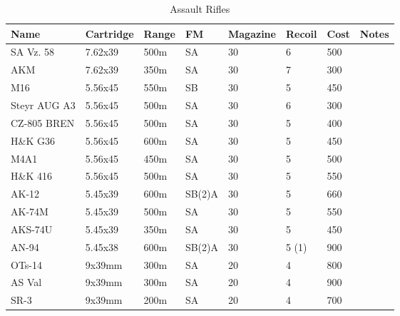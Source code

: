 \begin{table}
  \caption{Assault Rifles}
  \begin{center}
    \begin{tabular}{| l | l | l | l | l | l | l | l |}
      \hline
      \textbf{Name} & \textbf{Cartridge} & \textbf{Range} &
      \textbf{FM} & \textbf{Magazine} & \textbf{Recoil} &
      \textbf{Cost} & \textbf{Notes} \\ \hline

      SA Vz. 58    & 7.62x39 & 500m & SA  & 30 & 6 & 500 & \\ \hline
      AKM          & 7.62x39 & 350m & SA  & 30 & 7 & 300 & \\ \hline

      M16          & 5.56x45 & 550m & SB  & 30 & 5 & 450 & \\ \hline
      Steyr AUG A3 & 5.56x45 & 500m & SA  & 30 & 6 & 300 & \\ \hline
      CZ-805 BREN  & 5.56x45 & 500m & SA  & 30 & 5 & 400 & \\ \hline
      H\&K G36     & 5.56x45 & 600m & SA  & 30 & 5 & 450 & \\ \hline
      M4A1         & 5.56x45 & 450m & SA  & 30 & 5 & 500 & \\ \hline
      H\&K 416     & 5.56x45 & 500m & SA  & 30 & 5 & 550 & \\ \hline

      AK-12        & 5.45x39 & 600m & SB(2)A & 30 & 5 & 660 & \\ \hline
      AK-74M       & 5.45x39 & 500m & SA     & 30 & 5 & 550 & \\ \hline
      AKS-74U      & 5.45x39 & 350m & SA     & 30 & 5 & 450 & \\ \hline
      AN-94        & 5.45x38 & 600m & SB(2)A & 30 & 5 (1) & 900 & \\ \hline

      OTs-14       & 9x39mm  & 300m & SA     & 20 & 4 & 800 & \\ \hline
      AS Val       & 9x39mm  & 300m & SA     & 20 & 4 & 900 & \\ \hline
      SR-3         & 9x39mm  & 200m & SA     & 20 & 4 & 700 & \\ \hline

    \end{tabular}
  \end{center}
\end{table}


